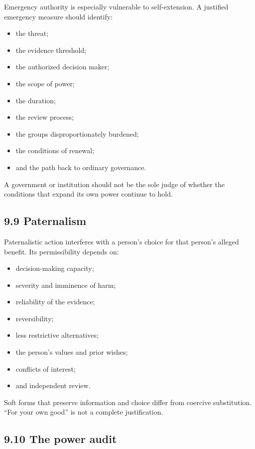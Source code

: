 \documentclass[
  11pt,
]{article}
\providecommand{\tightlist}{%
  \setlength{\itemsep}{0pt}\setlength{\parskip}{0pt}}
\begin{document}
Emergency authority is especially vulnerable to self-extension. A
justified emergency measure should identify:

\begin{itemize}
\tightlist
\item
  the threat;
\item
  the evidence threshold;
\item
  the authorized decision maker;
\item
  the scope of power;
\item
  the duration;
\item
  the review process;
\item
  the groups disproportionately burdened;
\item
  the conditions of renewal;
\item
  and the path back to ordinary governance.
\end{itemize}

A government or institution should not be the sole judge of whether the
conditions that expand its own power continue to hold.

\subsection{9.9 Paternalism}\label{paternalism}

Paternalistic action interferes with a person's choice for that person's
alleged benefit. Its permissibility depends on:

\begin{itemize}
\tightlist
\item
  decision-making capacity;
\item
  severity and imminence of harm;
\item
  reliability of the evidence;
\item
  reversibility;
\item
  less restrictive alternatives;
\item
  the person's values and prior wishes;
\item
  conflicts of interest;
\item
  and independent review.
\end{itemize}

Soft forms that preserve information and choice differ from coercive
substitution. ``For your own good'' is not a complete justification.

\subsection{9.10 The power audit}\label{the-power-audit}
\end{document}

